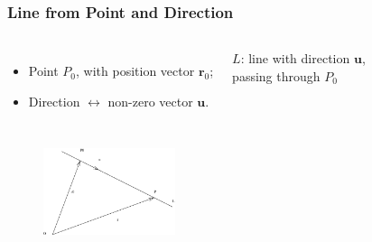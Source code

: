 \begin{frame}
 \frametitle{Line from Point and Direction}
\begin{columns}
  \column{6cm}
\begin{itemize}
 \item Point $P_0$, with position vector $\textbf{r}_0$;
\item Direction $\leftrightarrow$ non-zero vector $\textbf{u}$.
\end{itemize}
  \column{5cm}
 $L$: line with direction $\textbf{u}$, \\passing through $P_0$
\end{columns}

\bigskip

\begin{columns}
  \column{6cm}
  \column{6cm}
    \begin{figure}
        \includegraphics[height=1in]{../images/ok-line_point_direction_vector.eps}
    \end{figure}
\end{columns}



\end{frame}

